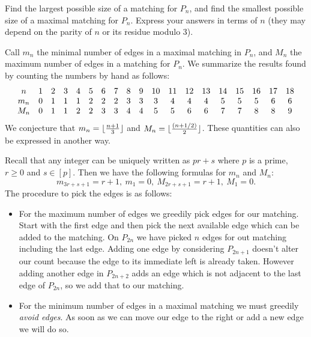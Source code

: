 \documentclass[12pt]{memoir}
\begin{document}
\begin{Ej}[Exercise 1]
    Find the largest possible size
    of a matching for $P_n$, and find the smallest possible size of a maximal matching for $P_n$. Express your
    answers in terms of $n$ (they may depend on the parity of $n$ or its residue modulo 3).
\end{Ej}

\begin{ptcbr}
    Call $m_n$ the minimal number of edges in a maximal matching in $P_n$, and $M_n$ the maximum number of edges in a matching for $P_n$. We summarize the results found by counting the numbers by hand as follows:
    $$
    \begin{matrix}
        n&1&2&3&4&5&6&7&8&9\\
        m_n&0&1&1&1&2&2&2&3&3\\
        M_n&0&1&1&2&2&3&3&4&4
    \end{matrix}\hspace*{1em}
    \begin{matrix}
        10&11&12&13&14&15&16&17&18\\
        3&4&4&4&5&5&5&6&6\\
        5&5&6&6&7&7&8&8&9
    \end{matrix} 
    $$
    We conjecture that $m_n=\lfloor\frac{n+1}{3}\rfloor$ and $M_n=\lfloor\frac{(n+1/2)}{2}\rfloor$. These quantities can also be expressed in another way.\par 
    Recall that any integer can be uniquely written as $pr+s$ where $p$ is a prime, $r\geq 0$ and $s\in[p]$. Then we have the following formulas for $m_n$ and $M_n$: 
    $$m_{3r+s+1}=r+1,\ m_1=0,\ M_{2r+s+1}=r+1,\ M_1=0.$$
    The procedure to pick the edges is as follows:
    \begin{itemize}
        \itemsep=-0.4em
        \item For the maximum number of edges we greedily pick edges for our matching. Start with the first edge and then pick the next available edge which can be added to the matching. On $P_{2n}$ we have picked $n$ edges for out matching including the last edge. Adding one edge by considering $P_{2n+1}$ doesn't alter our count because the edge to its immediate left is already taken. However adding another edge in $P_{2n+2}$ adds an edge which is not adjacent to the last edge of $P_{2n}$, so we add that to our matching.
        \item For the minimum number of edges in a maximal matching we must greedily \emph{avoid edges}. As soon as we can move our edge to the right or add a new edge we will do so. 
        \begin{center}
            


\end{center}
\end{itemize}
\end{ptcbr}
\end{document}
